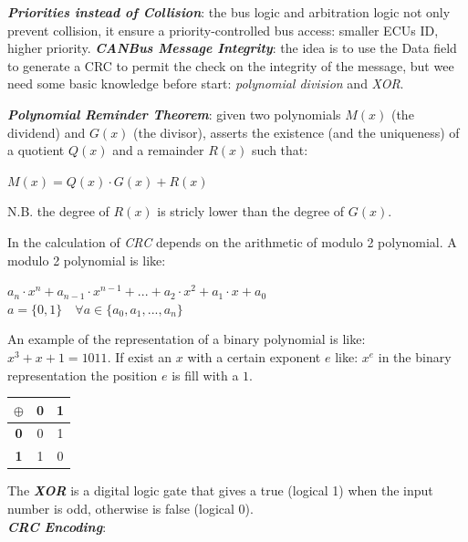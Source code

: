 \textbf{\textit{Priorities instead of Collision}}: the bus logic and arbitration logic not only prevent collision, it ensure a priority-controlled bus access: smaller ECUs ID, higher priority.
\newpage
\textbf{\textit{CANBus Message Integrity}}: the idea is to use the Data field to generate a CRC to permit the check on the integrity of the message, but wee need some basic knowledge before start: \textit{polynomial division} and \textit{XOR}. 
\begin{boxA}
    \textbf{\textit{Polynomial Reminder Theorem}}: given two polynomials $M(x)$ (the dividend) and $G(x)$ (the divisor), asserts the existence (and the uniqueness) of a quotient $Q(x)$ and a remainder $R(x)$ such that:
    \begin{center}
        \begin{math}
            M(x) = Q(x) \cdot G(x) + R(x)
        \end{math}
    \end{center}
    N.B. the degree of $R(x)$ is stricly lower than the degree of $G(x)$.
\end{boxA}
In the calculation of \textit{CRC} depends on the arithmetic of modulo 2 polynomial. A modulo 2 polynomial is like:
\begin{center}
    $a_n \cdot x^n + a_{n-1} \cdot x^{n-1} + ... + a_2 \cdot x^2 + a_1 \cdot x + a_0$ \\
    $a = \{0, 1\} \quad \forall a \in \{a_0, a_1, ..., a_n\}$
\end{center}
An example of the representation of a binary polynomial is like: $x^3 + x + 1 = 1011$. If exist an $x$ with a certain exponent $e$ like: $x^e$ in the binary representation the position $e$ is fill with a $1$. \\
\begin{center}
    \begin{tabular}{ | c | c | c | } \hline
        $\oplus$ & \textbf{0} & \textbf{1} \\ \hline
        \textbf{0} & 0 & 1 \\ \hline
        \textbf{1} & 1 & 0 \\ \hline
    \end{tabular}
\end{center}
The \textbf{\textit{XOR}} is a digital logic gate that gives a true (logical 1) when the input number is odd, otherwise is false (logical 0). \\ \newline
\textbf{\textit{CRC Encoding}}:
